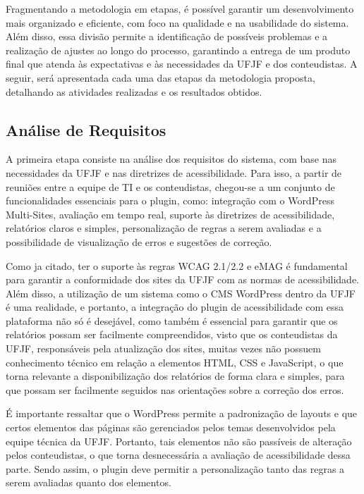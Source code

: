 \documentclass[
	article,			%
	12pt,				%
	oneside,			%
	a4paper,			%
	section=TITLE,		%
	subsection=TITLE,	%
	english,			%
	brazil,				%
	sumario=tradicional
	]{abntex2}
\begin{document}
Fragmentando a metodologia em etapas, é possível garantir um desenvolvimento
mais organizado e eficiente, com foco na qualidade e na usabilidade do sistema.
Além disso, essa divisão permite a identificação de possíveis problemas
e a realização de ajustes ao longo do processo, garantindo a entrega de um
produto final que atenda às expectativas e às necessidades da UFJF e dos
conteudistas. A seguir, será apresentada cada uma das etapas da metodologia
proposta, detalhando as atividades realizadas e os resultados obtidos.

\subsection{Análise de Requisitos}
A primeira etapa consiste na análise dos requisitos do sistema, com base nas
necessidades da UFJF e nas diretrizes de acessibilidade. Para isso, a partir
de reuniões entre a equipe de TI e os conteudistas, chegou-se a um conjunto de
funcionalidades essenciais para o plugin, como: integração com o WordPress
Multi-Sites, avaliação em tempo real, suporte às diretrizes de acessibilidade,
relatórios claros e simples, personalização de regras a serem avaliadas e a
possibilidade de visualização de erros e sugestões de correção.

Como ja citado, ter o suporte às regras WCAG 2.1/2.2 e eMAG é fundamental para
garantir a conformidade dos sites da UFJF com as normas de acessibilidade.
Além disso, a utilização de um sistema como o CMS WordPress dentro da UFJF
é uma realidade, e portanto, a integração do plugin de acessibilidade com
essa plataforma não só é desejável, como também é essencial para garantir
que os relatórios possam ser facilmente compreendidos, visto que os
conteudistas da UFJF, responsáveis pela atualização dos sites, muitas
vezes não possuem conhecimento técnico em relação a elementos HTML,
CSS e JavaScript, o que torna relevante a disponibilização dos
relatórios de forma clara e simples, para que possam ser facilmente seguidos nas orientações sobre a
correção dos erros.

É importante ressaltar que o WordPress permite a padronização de layouts 
e que certos elementos das páginas são gerenciados pelos temas desenvolvidos pela 
equipe técnica da UFJF. Portanto, tais elementos não são passíveis de alteração
pelos conteudistas, o que torna desnecessária a avaliação de acessibilidade dessa parte. 
Sendo assim, o plugin deve permitir a
personalização tanto das regras a serem avaliadas quanto dos elementos.
\end{document}

